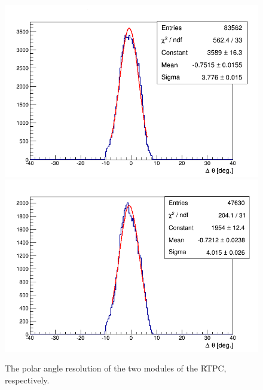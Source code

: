\begin{figure}[tbp]
\includegraphics[scale=0.31]{fig_rtpc/fit_delta_theta_l.png}
\includegraphics[scale=0.31]{fig_rtpc/fit_delta_theta_r.png}
\caption{The polar angle resolution of the two modules of the RTPC, 
respectively.}
\label{fig:rtpc_resolution_theta}
\end{figure}

